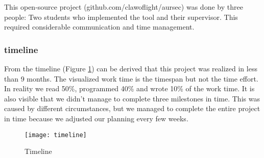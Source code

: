 This open-source project (github.com/clawoflight/aursec) was done by three people: Two students who implemented the tool and their supervisor. This required considerable communication and time management.

\subsubsection*{timeline}
From the timeline (Figure \ref{fig:timeline}) can be derived that this project was realized in less than 9 months. The visualized work time is the timespan but not the time effort. In reality we read 50\%, programmed 40\% and wrote 10\% of the work time.
It is also visible that we didn't manage to complete three milestones in time. This was caused by different circumstances, but we managed to complete the entire project in time because we adjusted our planning every few weeks.

\begin{figure}[!htb]
	\centering
		\texttt{[image: timeline]}
	\caption{Timeline}
	\label{fig:timeline}
\end{figure}

